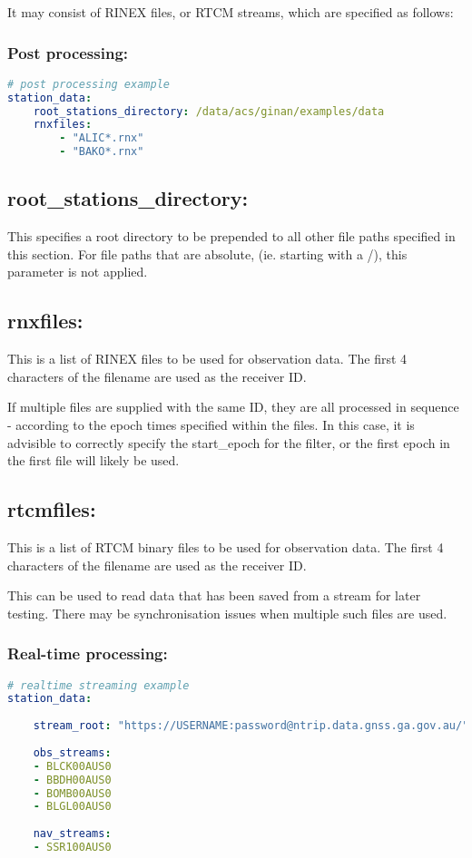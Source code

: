 It may consist of RINEX files, or RTCM streams, which are specified as follows:
\subsubsection{Post processing:}

\begin{lstlisting}[language=yaml,caption=station\_data:]
# post processing example
station_data:
	root_stations_directory: /data/acs/ginan/examples/data
	rnxfiles:
		- "ALIC*.rnx"
		- "BAKO*.rnx"
\end{lstlisting}


\subsection{root\_stations\_directory:}
This specifies a root directory to be prepended to all other file paths specified in this section. For file paths that are absolute, (ie. starting with a /), this parameter is not applied.

\subsection{rnxfiles:}
This is a list of RINEX files to be used for observation data. The first 4 characters of the filename are used as the receiver ID.

If multiple files are supplied with the same ID, they are all processed in sequence - according to the epoch times specified within the files. In this case, it is advisible to correctly specify the start\_epoch for the filter, or the first epoch in the first file will likely be used.

\subsection{rtcmfiles:}
This is a list of RTCM binary files to be used for observation data. The first 4 characters of the filename are used as the receiver ID.

This can be used to read data that has been saved from a stream for later testing. There may be synchronisation issues when multiple such files are used.

\subsubsection{Real-time processing:}
\begin{lstlisting}[language=yaml,caption=station\_data:]
# realtime streaming example
station_data:
	
	stream_root: "https://USERNAME:password@ntrip.data.gnss.ga.gov.au/"
	
	obs_streams:
	- BLCK00AUS0
	- BBDH00AUS0
	- BOMB00AUS0
	- BLGL00AUS0
	
	nav_streams:
	- SSR100AUS0
\end{lstlisting}


